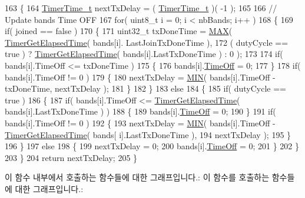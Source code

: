 \begin{DoxyCode}
163 \{
164     \mbox{\hyperlink{utilities_8h_a4215ca43d3e953099ea758ce428599d0}{TimerTime\_t}} nextTxDelay = ( \mbox{\hyperlink{utilities_8h_a4215ca43d3e953099ea758ce428599d0}{TimerTime\_t}} )( -1 );
165 
166     \textcolor{comment}{// Update bands Time OFF}
167     \textcolor{keywordflow}{for}( uint8\_t i = 0; i < nbBands; i++ )
168     \{
169         \textcolor{keywordflow}{if}( joined == \textcolor{keyword}{false} )
170         \{
171             uint32\_t txDoneTime =  \mbox{\hyperlink{utilities_8h_afa99ec4acc4ecb2dc3c2d05da15d0e3f}{MAX}}( \mbox{\hyperlink{time_server_8c_a9ca7e27f3d6474daff63f2e093a2e91e}{TimerGetElapsedTime}}( bands[i].
      LastJoinTxDoneTime ),
172                                         ( dutyCycle == \textcolor{keyword}{true} ) ? 
      \mbox{\hyperlink{time_server_8c_a9ca7e27f3d6474daff63f2e093a2e91e}{TimerGetElapsedTime}}( bands[i].LastTxDoneTime ) : 0 );
173 
174             \textcolor{keywordflow}{if}( bands[i].TimeOff <= txDoneTime )
175             \{
176                 bands[i].\mbox{\hyperlink{structs_band_a4de67f0652eb4259907c41ea8056c318}{TimeOff}} = 0;
177             \}
178             \textcolor{keywordflow}{if}( bands[i].TimeOff != 0 )
179             \{
180                 nextTxDelay = \mbox{\hyperlink{utilities_8h_a3acffbd305ee72dcd4593c0d8af64a4f}{MIN}}( bands[i].TimeOff - txDoneTime, nextTxDelay );
181             \}
182         \}
183         \textcolor{keywordflow}{else}
184         \{
185             \textcolor{keywordflow}{if}( dutyCycle == \textcolor{keyword}{true} )
186             \{
187                 \textcolor{keywordflow}{if}( bands[i].TimeOff <= \mbox{\hyperlink{time_server_8c_a9ca7e27f3d6474daff63f2e093a2e91e}{TimerGetElapsedTime}}( bands[i].LastTxDoneTime ) )
188                 \{
189                     bands[i].\mbox{\hyperlink{structs_band_a4de67f0652eb4259907c41ea8056c318}{TimeOff}} = 0;
190                 \}
191                 \textcolor{keywordflow}{if}( bands[i].TimeOff != 0 )
192                 \{
193                     nextTxDelay = \mbox{\hyperlink{utilities_8h_a3acffbd305ee72dcd4593c0d8af64a4f}{MIN}}( bands[i].TimeOff - \mbox{\hyperlink{time_server_8c_a9ca7e27f3d6474daff63f2e093a2e91e}{TimerGetElapsedTime}}( bands[
      i].LastTxDoneTime ),
194                                        nextTxDelay );
195                 \}
196             \}
197             \textcolor{keywordflow}{else}
198             \{
199                 nextTxDelay = 0;
200                 bands[i].\mbox{\hyperlink{structs_band_a4de67f0652eb4259907c41ea8056c318}{TimeOff}} = 0;
201             \}
202         \}
203     \}
204     \textcolor{keywordflow}{return} nextTxDelay;
205 \}
\end{DoxyCode}
이 함수 내부에서 호출하는 함수들에 대한 그래프입니다.\+:
이 함수를 호출하는 함수들에 대한 그래프입니다.\+:
\mbox{\label{group___r_e_g_i_o_n_c_o_m_m_o_n_gafdd1c80d953e18d755a631b72a9c3bd3}} 

